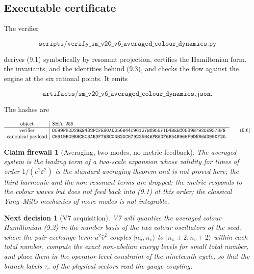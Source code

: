 \documentclass[11pt]{article}
\newtheorem{firewall}[theorem]{Claim firewall}
\newtheorem{decision}[theorem]{Next decision}
\theoremstyle{remark}
\begin{document}
\subsection{Executable certificate}

The verifier

\[
 \texttt{scripts/verify\_sm\_v20\_v6\_averaged\_colour\_dynamics.py}  \tag{9.4}
\]

derives (9.1) symbolically by resonant projection, certifies the
Hamiltonian form, the invariants, and the identities behind (9.3),
and checks the flow against the engine at the six rational points.  It
emits

\[
 \texttt{artifacts/sm\_v20\_v6\_averaged\_colour\_dynamics.json}.     \tag{9.5}
\]

The hashes are

\[
\begin{array}{c|l}
\hbox{object}&\hbox{SHA--256}\\ \hline
\hbox{verifier}&
\texttt{D099F8DD29E9432FCFE60AD256A44C96127B0955F1D4BEEC0539B792DE9378F9}\\
\hbox{canonical payload}&
\texttt{C8919B09B8C8C3AB3F76BC04820C879225846FE6DF6B54B968F9D5B6AD99DF20}.
\end{array}                                                     \tag{9.6}
\]

\begin{firewall}[Averaging, two modes, no metric feedback]
\label{fire:v20v6}
The averaged system is the leading term of a two-scale expansion
whose validity for times of order \(1/(e^2\varepsilon^2)\) is the
standard averaging theorem and is not proved here; the third
harmonic and the non-resonant terms are dropped; the metric responds
to the colour waves but does not feed back into (9.1) at this order;
the classical Yang--Mills mechanics of more modes is not integrable.
\end{firewall}

\begin{decision}[V7 acquisition]
\label{dec:v20v6-next}
V7 will quantize the averaged colour Hamiltonian (9.2) in the number
basis of the two colour oscillators of the seed, where the
pair-exchange term \(u^2\bar v^2\) couples \(|n_u,n_v\rangle\) to
\(|n_u\pm2,n_v\mp2\rangle\) within each total number, compute the
exact non-abelian energy levels for small total number, and place
them in the operator-level constraint of the nineteenth cycle, so
that the branch labels \(\tau_e\) of the physical sectors read the
gauge coupling.
\end{decision}
\end{document}
